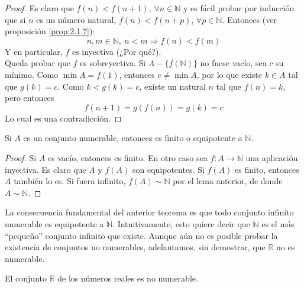 \begin{proof}
    Es claro que $f(n) < f(n+1)$, $\forall n \in \mathbb{N}$ y es fácil probar por inducción que
    si $n$ es un número natural, $f(n) < f(n+p)$, $\forall p \in \mathbb{N}$.
    Entonces (ver proposición \ref{prop:2.1.7}):
    \begin{equation*}
        n,m \in \mathbb{N},~n < m \Longrightarrow f(n) < f(m)
    \end{equation*}
    Y en particular, $f$ es inyectiva (¿Por qué?).\\
    
    Queda probar que $f$ es sobreyectiva. Si $A - \{f(\mathbb{N})\}$ no fuese vacío, sea $c$ su mínimo.
    Como $\min A = f(1)$, entonces $c \neq \min A$, por lo que existe $k \in A$ tal que $g(k) = c$.
    Como $k < g(k) = c$, existe un natural $n$ tal que $f(n) = k$, pero entonces
    \begin{equation*}
        f(n+1)=g(f(n))=g(k)=c
    \end{equation*}
    Lo cual es una contradicción.
\end{proof}

\begin{teo}\label{teo:2.4.3}
    Si $A$ es un conjunto numerable, entonces es finito o equipotente a $\mathbb{N}$.
\end{teo}
\begin{proof}
    Si $A$ es vacío, entonces es finito. En otro caso sea $f:A \longrightarrow \mathbb{N}$ una aplicación inyectiva. Es claro que $A$ y $f(A)$ son equipotentes. Si $f(A)$ es finito, entonces $A$ también lo es.
    Si fuera infinito, $f(A) \sim \mathbb{N}$ por el lema anterior, de donde $A \sim \mathbb{N}$.
\end{proof}

La consecuencia fundamental del anterior teorema es que todo conjunto infinito numerable es equipotente a $\mathbb{N}$. Intuitivamente, esto quiere decir que $\mathbb{N}$ es el más ``pequeño'' conjunto infinito que existe. Aunque aún no es posible probar la existencia de conjuntos no numerables, adelantamos, sin demostrar,
que $\mathbb{R}$ no es numerable.
\begin{teo}
    El conjunto $\mathbb{R}$ de los números reales es no numerable.
\end{teo}


